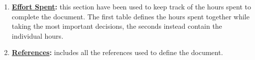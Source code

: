 \begin{enumerate}
			\item \textbf{\hyperref[sec:effortSpent]{Effort Spent}:} this section have been used to keep track of the hours spent to complete the document. The first table defines the hours spent together while taking the most important decisions, the seconds instead contain the individual hours.
			
			\item \textbf{\hyperref[sec:references]{References}:} includes all the references used to define the document.
		\end{enumerate}			